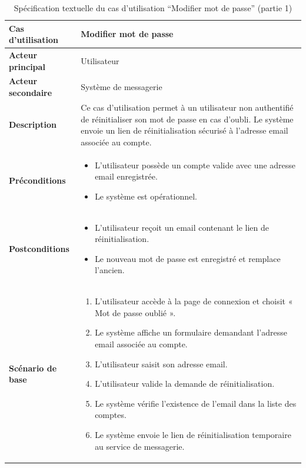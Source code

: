 \documentclass[a4paper,11pt]{report}
\begin{document}
\begin{table}[H]
  \centering
  \renewcommand{\arraystretch}{1.5}
  \caption{Spécification textuelle du cas d'utilisation “Modifier mot de passe” (partie 1)}
  \begin{tabularx}{\textwidth}{|l|X|}
    \hline
    \textbf{Cas d'utilisation}    & Modifier mot de passe \\ \hline
    \textbf{Acteur principal}     & Utilisateur \\ \hline
    \textbf{Acteur secondaire}    & Système de messagerie \\ \hline
    \textbf{Description}          & Ce cas d'utilisation permet à un utilisateur non authentifié de réinitialiser son mot de passe en cas d'oubli. Le système envoie un lien de réinitialisation sécurisé à l'adresse email associée au compte. \\ \hline
    \textbf{Préconditions}        &
      \begin{itemize}[leftmargin=*]
        \item L’utilisateur possède un compte valide avec une adresse email enregistrée.
        \item Le système est opérationnel.
      \end{itemize} \\ \hline
    \textbf{Postconditions}       &
      \begin{itemize}[leftmargin=*]
        \item L’utilisateur reçoit un email contenant le lien de réinitialisation.
        \item Le nouveau mot de passe est enregistré et remplace l'ancien.
      \end{itemize} \\ \hline
    \textbf{Scénario de base}      &
      \begin{enumerate}[leftmargin=*]
        \item L’utilisateur accède à la page de connexion et choisit « Mot de passe oublié ».
        \item Le système affiche un formulaire demandant l’adresse email associée au compte.
        \item L’utilisateur saisit son adresse email.
        \item L’utilisateur valide la demande de réinitialisation.
        \item Le système vérifie l’existence de l’email dans la liste des comptes.
        \item Le système envoie le lien de réinitialisation temporaire au service de messagerie.

\end{enumerate}
\end{tabularx}
\end{table}
\end{document}
